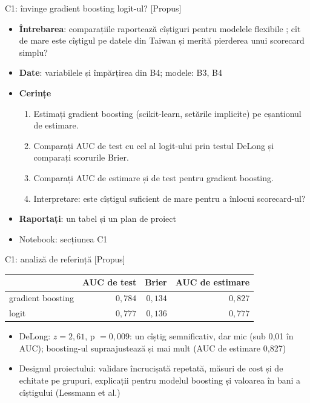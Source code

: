 \begin{frame}{C1: învinge gradient boosting logit-ul? [Propus]}
\itemsize{\footnotesize}
\begin{itemize}
\item \textbf{Întrebarea}: comparațiile raportează cîștiguri pentru modelele flexibile ; cît de mare este cîștigul pe datele din Taiwan și merită pierderea unui scorecard simplu?
\item \textbf{Date}: variabilele și împărțirea din B4; modele: B3, B4
\item \textbf{Cerințe}
\begin{enumerate}
    \item Estimați gradient boosting (scikit-learn, setările implicite) pe eșantionul de estimare.
    \item Comparați AUC de test cu cel al logit-ului prin testul DeLong și comparați scorurile Brier.
    \item Comparați AUC de estimare și de test pentru gradient boosting.
    \item Interpretare: este cîștigul suficient de mare pentru a înlocui scorecard-ul?
\end{enumerate}
\item \textbf{Raportați}: un tabel și un plan de proiect
\item Notebook: secțiunea C1
\end{itemize}
\end{frame}

\ifsolutions
\begin{frame}{C1: analiză de referință [Propus]}
\itemsize{\footnotesize}
\begin{center}
\scriptsize
\begin{tabular}{lrrr}
\toprule
& AUC de test & Brier & AUC de estimare \\
\midrule
gradient boosting & $0{,}784$ & $0{,}134$ & $0{,}827$ \\
logit & $0{,}777$ & $0{,}136$ & $0{,}777$ \\
\bottomrule
\end{tabular}
\end{center}
\begin{itemize}
    \item DeLong: $z = 2{,}61$, p $= 0{,}009$: un cîștig semnificativ, dar mic (sub 0,01 în AUC); boosting-ul supraajustează și mai mult (AUC de estimare 0{,}827)
    \item Designul proiectului: validare încrucișată repetată, măsuri de cost și de echitate pe grupuri, explicații pentru modelul boosting și valoarea în bani a cîștigului (Lessmann et al.)
\end{itemize}
\end{frame}
\fi

